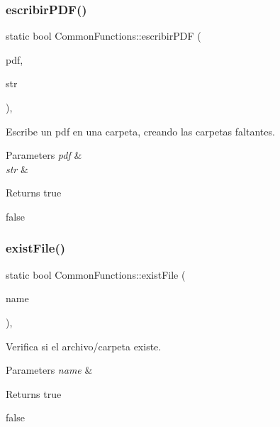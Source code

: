 \subsubsection{\texorpdfstring{escribir\+P\+D\+F()}{escribirPDF()}}
{\footnotesize\ttfamily static bool Common\+Functions\+::escribir\+P\+DF (\begin{DoxyParamCaption}\item[{H\+P\+D\+F\+\_\+\+Doc}]{pdf,  }\item[{string}]{str }\end{DoxyParamCaption})\hspace{0.3cm}{\ttfamily [inline]}, {\ttfamily [static]}}



Escribe un pdf en una carpeta, creando las carpetas faltantes. 


\begin{DoxyParams}{Parameters}
{\em pdf} & \\
\hline
{\em str} & \\
\hline
\end{DoxyParams}
\begin{DoxyReturn}{Returns}
true 

false 
\end{DoxyReturn}
\mbox{\label{classCommonFunctions_a91521d26a009071499a413ef4535ca8a}} 
\subsubsection{\texorpdfstring{exist\+File()}{existFile()}}
{\footnotesize\ttfamily static bool Common\+Functions\+::exist\+File (\begin{DoxyParamCaption}\item[{string}]{name }\end{DoxyParamCaption})\hspace{0.3cm}{\ttfamily [inline]}, {\ttfamily [static]}}



Verifica si el archivo/carpeta existe. 


\begin{DoxyParams}{Parameters}
{\em name} & \\
\hline
\end{DoxyParams}
\begin{DoxyReturn}{Returns}
true 

false 
\end{DoxyReturn}
\mbox{\label{classCommonFunctions_a7b0e52ec4c30af5244724936f163c2d1}} 

